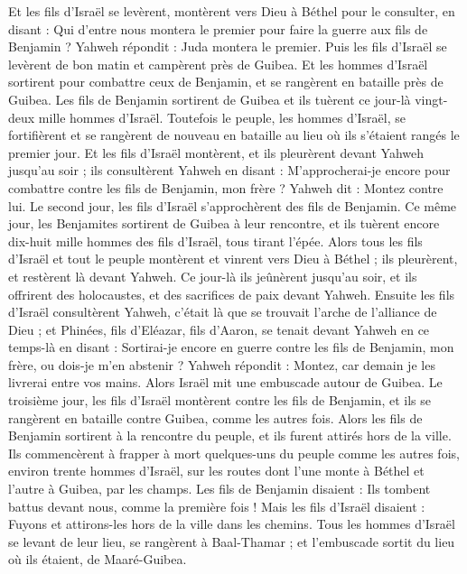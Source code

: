 \begin{multicols}{2}
Et les fils d'Israël se levèrent, montèrent vers Dieu à Béthel pour le consulter, en disant : Qui d'entre nous montera le premier pour faire la guerre aux fils de Benjamin ? Yahweh répondit : Juda montera le premier.
Puis les fils d'Israël se levèrent de bon matin et campèrent près de Guibea.
Et les hommes d'Israël sortirent pour combattre ceux de Benjamin, et se rangèrent en bataille près de Guibea.
Les fils de Benjamin sortirent de Guibea et ils tuèrent ce jour-là vingt-deux mille hommes d'Israël.
Toutefois le peuple, les hommes d'Israël, se fortifièrent et se rangèrent de nouveau en bataille au lieu où ils s'étaient rangés le premier jour.
Et les fils d'Israël montèrent, et ils pleurèrent devant Yahweh jusqu'au soir ; ils consultèrent Yahweh en disant : M'approcherai-je encore pour combattre contre les fils de Benjamin, mon frère ? Yahweh dit : Montez contre lui.
Le second jour, les fils d'Israël s'approchèrent des fils de Benjamin.
Ce même jour, les Benjamites sortirent de Guibea à leur rencontre, et ils tuèrent encore dix-huit mille hommes des fils d'Israël, tous tirant l'épée.
Alors tous les fils d'Israël et tout le peuple montèrent et vinrent vers Dieu à Béthel ; ils pleurèrent, et restèrent là devant Yahweh. Ce jour-là ils jeûnèrent jusqu'au soir, et ils offrirent des holocaustes, et des sacrifices de paix devant Yahweh.
Ensuite les fils d'Israël consultèrent Yahweh, c'était là que se trouvait l'arche de l'alliance de Dieu ;
et Phinées, fils d'Eléazar, fils d'Aaron, se tenait devant Yahweh en ce temps-là en disant : Sortirai-je encore en guerre contre les fils de Benjamin, mon frère, ou dois-je m'en abstenir ? Yahweh répondit : Montez, car demain je les livrerai entre vos mains.
Alors Israël mit une embuscade autour de Guibea.
Le troisième jour, les fils d'Israël montèrent contre les fils de Benjamin, et ils se rangèrent en bataille contre Guibea, comme les autres fois.
Alors les fils de Benjamin sortirent à la rencontre du peuple, et ils furent attirés hors de la ville. Ils commencèrent à frapper à mort quelques-uns du peuple comme les autres fois, environ trente hommes d'Israël, sur les routes dont l'une monte à Béthel et l'autre à Guibea, par les champs.
Les fils de Benjamin disaient : Ils tombent battus devant nous, comme la première fois ! Mais les fils d'Israël disaient : Fuyons et attirons-les hors de la ville dans les chemins.
Tous les hommes d'Israël se levant de leur lieu, se rangèrent à Baal-Thamar ; et l'embuscade sortit du lieu où ils étaient, de Maaré-Guibea.

\end{multicols}
